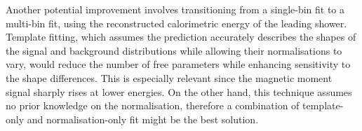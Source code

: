 Another potential improvement involves transitioning from a single-bin fit to a multi-bin fit, using the reconstructed calorimetric energy of the leading shower. Template fitting, which assumes the prediction accurately describes the shapes of the signal and background distributions while allowing their normalisations to vary, would reduce the number of free parameters while enhancing sensitivity to the shape differences. This is especially relevant since the magnetic moment signal sharply rises at lower energies. On the other hand, this technique assumes no prior knowledge on the normalisation, therefore a combination of template-only and normalisation-only fit might be the best solution.

